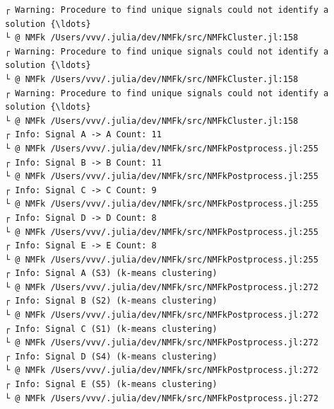 \documentclass[11pt]{article}
\begin{document}
    \begin{Verbatim}[commandchars=\\\{\}]
┌ Warning: Procedure to find unique signals could not identify a solution {\ldots}
└ @ NMFk /Users/vvv/.julia/dev/NMFk/src/NMFkCluster.jl:158
┌ Warning: Procedure to find unique signals could not identify a solution {\ldots}
└ @ NMFk /Users/vvv/.julia/dev/NMFk/src/NMFkCluster.jl:158
┌ Warning: Procedure to find unique signals could not identify a solution {\ldots}
└ @ NMFk /Users/vvv/.julia/dev/NMFk/src/NMFkCluster.jl:158
┌ Info: Signal A -> A Count: 11
└ @ NMFk /Users/vvv/.julia/dev/NMFk/src/NMFkPostprocess.jl:255
┌ Info: Signal B -> B Count: 11
└ @ NMFk /Users/vvv/.julia/dev/NMFk/src/NMFkPostprocess.jl:255
┌ Info: Signal C -> C Count: 9
└ @ NMFk /Users/vvv/.julia/dev/NMFk/src/NMFkPostprocess.jl:255
┌ Info: Signal D -> D Count: 8
└ @ NMFk /Users/vvv/.julia/dev/NMFk/src/NMFkPostprocess.jl:255
┌ Info: Signal E -> E Count: 8
└ @ NMFk /Users/vvv/.julia/dev/NMFk/src/NMFkPostprocess.jl:255
┌ Info: Signal A (S3) (k-means clustering)
└ @ NMFk /Users/vvv/.julia/dev/NMFk/src/NMFkPostprocess.jl:272
┌ Info: Signal B (S2) (k-means clustering)
└ @ NMFk /Users/vvv/.julia/dev/NMFk/src/NMFkPostprocess.jl:272
┌ Info: Signal C (S1) (k-means clustering)
└ @ NMFk /Users/vvv/.julia/dev/NMFk/src/NMFkPostprocess.jl:272
┌ Info: Signal D (S4) (k-means clustering)
└ @ NMFk /Users/vvv/.julia/dev/NMFk/src/NMFkPostprocess.jl:272
┌ Info: Signal E (S5) (k-means clustering)
└ @ NMFk /Users/vvv/.julia/dev/NMFk/src/NMFkPostprocess.jl:272
    \end{Verbatim}

    \begin{center}
    \end{center}
    { \hspace*{\fill} \\}
    
    \begin{Verbatim}[commandchars=\\\{\}]

    \end{Verbatim}

    \begin{center}
    \end{center}
    { \hspace*{\fill} \\}
    
\end{document}

